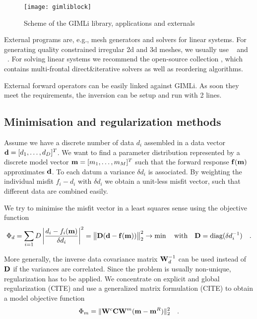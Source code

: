 \begin{figure}[htb]
\centering\texttt{[image: gimliblock]}
\caption{Scheme of the GIMLi library, applications and externals}\label{fig:gimliblock}
\end{figure} 

External programs are, e.g., mesh generators and solvers for linear systems.
For generating quality constrained irregular 2d and 3d meshes, we usually use ~\citep{triangle} and ~\citep{tetgen}.
For solving linear systems we recommend the open-source collection  \citep{davis}, which contains multi-frontal direct\&iterative solvers as well as reordering algorithms.

External forward operators can be easily linked against GIMLi.
As soon they meet the requirements, the inversion can be setup and run with 2 lines.

\subsection{Minimisation and regularization methods}\label{sec:mini}
Assume we have a discrete number of data $d_i$ assembled in a data vector $\mathbf{d}=[d_1,\ldots,d_D]^T$.
We want to find a parameter distribution represented by a discrete model vector $\mathbf{m}=[m_1,\ldots,m_M]^T$ such that the forward response $\mathbf{f}(\mathbf{m})$ approximates $\mathbf{d}$.
To each datum a variance $\delta d_i$ is associated.
By weighting the individual misfit $f_i-d_i$ with $\delta d_i$ we obtain a unit-less misfit vector, such that different data are combined easily.

We try to minimise the misfit vector in a least squares sense using the objective function
\begin{equation}\label{eq:phid}
\Phi_d=\sum\limits_{i=1}{D} \left| \frac{d_i-f_i(\mathbf{m})}{\delta d_i} \right|^2
= \big\Vert \mathbf{D}(\mathbf{d} - \mathbf{f}(\mathbf{m})) \big\Vert^2_2 \rightarrow \min
\quad\mbox{with}\quad \mathbf{D}=\mbox{diag}(\delta d_i^{-1})\quad.
\end{equation}

More generally, the inverse data covariance matrix $\mathbf{W}_d^{-1}$ can be used instead of $\mathbf{D}$ if the variances are correlated.
Since the problem is usually non-unique, regularization has to be applied.
We concentrate on explicit and global regularization (CITE) and use a generalized matrix formulation (CITE) to obtain a model objective function 
\begin{equation}\label{eq:phim}
\Phi_m = \|\mathbf{W}^c \mathbf{C} \mathbf{W}^m (\mathbf{m}-\mathbf{m}^R)\|^2_2\quad.
\end{equation}

